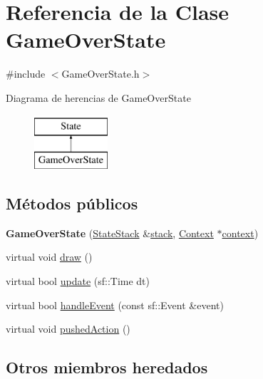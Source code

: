 \hypertarget{classGameOverState}{}\section{Referencia de la Clase Game\+Over\+State}
\label{classGameOverState}


{\ttfamily \#include $<$Game\+Over\+State.\+h$>$}

Diagrama de herencias de Game\+Over\+State\begin{figure}[H]
\begin{center}
\leavevmode
\includegraphics[height=2.000000cm]{classGameOverState}
\end{center}
\end{figure}
\subsection*{Métodos públicos}
\begin{DoxyCompactItemize}
\item 
\hypertarget{classGameOverState_ac57e844cdac39492f3b67e29e8ce7086}{}{\bfseries Game\+Over\+State} (\hyperlink{classStateStack}{State\+Stack} \&\hyperlink{classState_a86c8d3a5a1ee89896828be85a785fb04}{stack}, \hyperlink{classContext}{Context} $\ast$\hyperlink{classState_adc93e8ad3199b5891618ca88eed0436a}{context})\label{classGameOverState_ac57e844cdac39492f3b67e29e8ce7086}

\item 
virtual void \hyperlink{classGameOverState_a9decc1411647e390bfed0bdc009cd691}{draw} ()
\item 
virtual bool \hyperlink{classGameOverState_a8a2047b5c684965f33574b8aee7b7c8f}{update} (sf\+::\+Time dt)
\item 
virtual bool \hyperlink{classGameOverState_acf1dc2c7f58fe21b7cfababaf87ff20b}{handle\+Event} (const sf\+::\+Event \&event)
\item 
virtual void \hyperlink{classGameOverState_aa0e79a90d666351a0328b051dece3024}{pushed\+Action} ()
\end{DoxyCompactItemize}
\subsection*{Otros miembros heredados}


